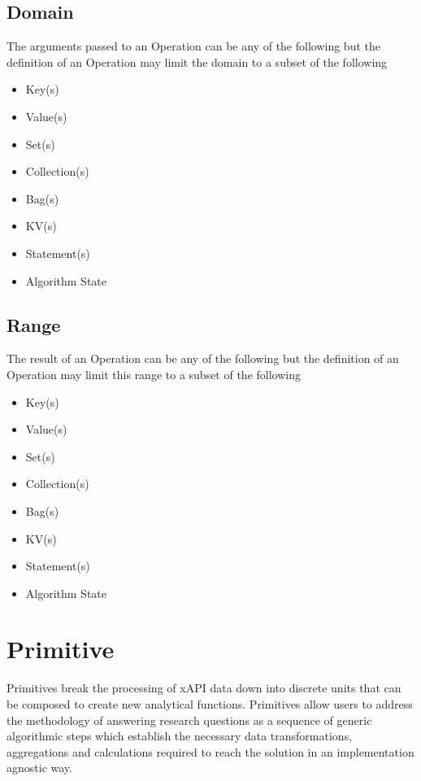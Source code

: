 \documentclass[../main.tex]{subfiles}
\begin{document}
\subsection{Domain}
The arguments passed to an Operation can be any of the following but the definition of an Operation may limit the domain to a subset of the following
\begin{itemize}
\item Key(s)
\item Value(s)
\item Set(s)
\item Collection(s)
\item Bag(s)
\item KV(s)
\item Statement(s)
\item Algorithm State
\end{itemize}

\subsection{Range}
The result of an Operation can be any of the following but the definition of an Operation may limit this range to a subset of the following

\begin{itemize}
\item Key(s)
\item Value(s)
\item Set(s)
\item Collection(s)
\item Bag(s)
\item KV(s)
\item Statement(s)
\item Algorithm State
\end{itemize}

\section{Primitive}
Primitives break the processing of xAPI data down into discrete units that can be composed to create new analytical functions.
Primitives allow users to address the methodology of answering research questions as a sequence of generic algorithmic steps
which establish the necessary data transformations, aggregations and calculations required to reach the solution in an implementation agnostic way.
\end{document}
